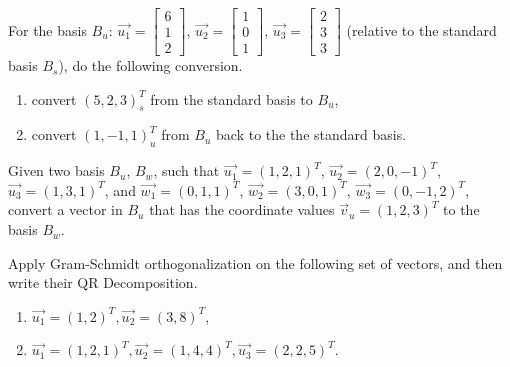 \begin{Exercise}
For the basis $B_u$: $\vec{u_1} = 
\begin{bmatrix}
6\\
1\\
2
\end{bmatrix}$,
$\vec{u_2} = 
\begin{bmatrix}
1\\
0\\
1
\end{bmatrix}$,
$\vec{u_3} = 
\begin{bmatrix}
2\\
3\\
3
\end{bmatrix}$
(relative to the standard basis $B_s$), do the following conversion.
\begin{enumerate}[label=(\alph*)]
\item convert $(5, 2, 3)^T_s$ from the standard basis to $B_u$,
\item convert $(1, -1, 1)^T_u$ from $B_u$ back to the the standard basis.
\end{enumerate}
\end{Exercise}

\begin{Exercise}
Given two basis $B_u$, $B_w$, such that $\vec{u_1} = (1,2,1)^T$, $\vec{u_2} = (2,0,-1)^T$, $\vec{u_3} = (1,3,1)^T$, and $\vec{w_1} = (0,1,1)^T$, $\vec{w_2} = (3,0,1)^T$, $\vec{w_3} = (0,-1,2)^T$, convert a vector in $B_u$ that has the coordinate values $\vec{v}_u = (1,2,3)^T$ to the basis $B_w$.
\end{Exercise}

\begin{Exercise}
Apply Gram-Schmidt orthogonalization on the following set of vectors, and then write their QR Decomposition.
\begin{enumerate}[label=(\alph*)]
\item $\vec{u_1} = (1,2)^T, \vec{u_2} = (3,8)^T$,
\item $\vec{u_1} = (1,2,1)^T, \vec{u_2} = (1,4,4)^T, \vec{u_3} = (2,2,5)^T$.
\end{enumerate}
\end{Exercise}